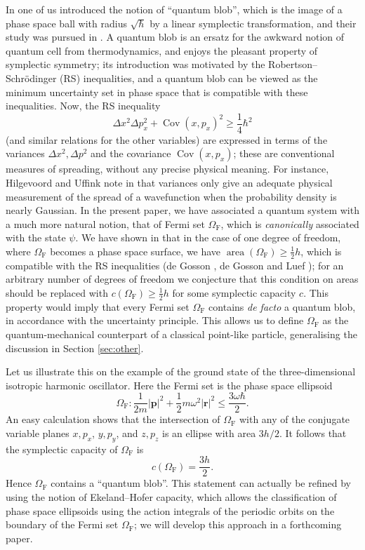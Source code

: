 \documentclass[12pt]{article}%
\begin{document}
In \cite{de03-2} one of us introduced the notion of \textquotedblleft quantum
blob\textquotedblright, which is the image of a phase space ball with radius
$\sqrt{\hbar}$ by a linear symplectic transformation, and their study was
pursued in \cite{Birk,blobs}. A quantum blob is an ersatz for the awkward
notion of quantum cell from thermodynamics, and enjoys the pleasant property
of symplectic symmetry; its introduction was motivated by the
Robertson--Schr\"{o}dinger (RS) inequalities, and a quantum blob can be viewed
as the minimum uncertainty set in phase space that is compatible with these
inequalities. Now, the RS inequality
\[
\Delta x^{2}\Delta p_{x}^{2}+\operatorname*{Cov}(x,p_{x})^{2}\geq\frac{1}%
{4}\hbar^{2}%
\]
(and similar relations for the other variables) are expressed in terms of the
variances $\Delta x^{2},\Delta p^{2}$ and the covariance $\operatorname*{Cov}%
(x,p_{x})$; these are conventional measures of spreading, without any precise
physical meaning. For instance, Hilgevoord and Uffink note in
\cite{hi02,hiuf85bis} that variances only give an adequate physical
measurement of the spread of a wavefunction when the probability density is
nearly Gaussian. In the present paper, we have associated a quantum system
with a much more natural notion, that of Fermi set $\Omega_{\mathrm{F}}$,
which is \emph{canonically} associated with the state $\psi$. We have shown in
\cite{degohi14} that in the case of one degree of freedom, where
$\Omega_{\mathrm{F}}$ becomes a phase space surface, we have
$\operatorname*{area}(\Omega_{\mathrm{F}})\geq\frac{1}{2}h$, which is
compatible with the RS inequalities (de Gosson \cite{de02-2,de03-2,go09}, de
Gosson and Luef \cite{golu10}); for an arbitrary number of degrees of freedom
we conjecture that this condition on areas should be replaced with
$c(\Omega_{\mathrm{F}})\geq\frac{1}{2}h$ for some symplectic capacity $c$.
This property would imply that every Fermi set $\Omega_{\mathrm{F}}$ contains
\textit{de facto} \cite{blobs,golu10} a quantum blob, in accordance with the
uncertainty principle. This allows us to define $\Omega_{\mathrm{F}}$ as the
quantum-mechanical counterpart of a classical point-like particle,
generalising the discussion in Section \ref{sec:other}.

Let us illustrate this on the example of the ground state of the
three-dimensional isotropic harmonic oscillator. Here the Fermi set is the
phase space ellipsoid%
\[
\Omega_{\mathrm{F}}:\frac{1}{2m}|\mathbf{p}|^{2}+\frac{1}{2}m\omega
^{2}|\mathbf{r}|^{2}\leq\frac{3\omega\hbar}{2}.
\]
An easy calculation shows that the intersection of $\Omega_{\mathrm{F}}$ with
any of the conjugate variable planes $x,p_{x}$, $y,p_{y}$, and $z,p_{z}$ is an
ellipse with area $3h/2$. It follows \cite{eggs} that the symplectic capacity
of $\Omega_{\mathrm{F}}$ is
\[
c(\Omega_{\mathrm{F}})=\frac{3h}{2}.
\]
Hence $\Omega_{\mathrm{F}}$ contains a \textquotedblleft quantum
blob\textquotedblright. This statement can actually be refined by using the
notion of Ekeland--Hofer capacity, which allows the classification of phase
space ellipsoids using the action integrals of the periodic orbits on the
boundary of the Fermi set $\Omega_{\mathrm{F}}$; we will develop this approach
in a forthcoming paper.
\end{document}
